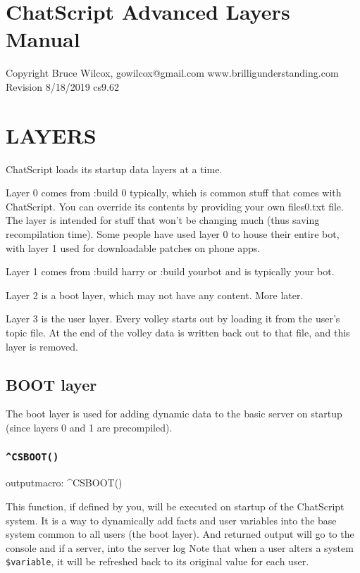 \documentclass[]{article}
\date{}
\begin{document}
\section{ChatScript Advanced Layers
Manual}\label{chatscript-advanced-layers-manual}

Copyright Bruce Wilcox, gowilcox@gmail.com www.brilligunderstanding.com
Revision 8/18/2019 cs9.62

\section{LAYERS}\label{layers}

ChatScript loads its startup data layers at a time.

Layer 0 comes from :build 0 typically, which is common stuff that comes
with ChatScript. You can override its contents by providing your own
files0.txt file. The layer is intended for stuff that won't be changing
much (thus saving recompilation time). Some people have used layer 0 to
house their entire bot, with layer 1 used for downloadable patches on
phone apps.

Layer 1 comes from :build harry or :build yourbot and is typically your
bot.

Layer 2 is a boot layer, which may not have any content. More later.

Layer 3 is the user layer. Every volley starts out by loading it from
the user's topic file. At the end of the volley data is written back out
to that file, and this layer is removed.

\subsection{BOOT layer}\label{boot-layer}

The boot layer is used for adding dynamic data to the basic server on
startup (since layers 0 and 1 are precompiled).

\subsubsection{\texorpdfstring{\texttt{\^{}CSBOOT()}}{\^{}CSBOOT()}}\label{csboot}

outputmacro: \^{}CSBOOT()

This function, if defined by you, will be executed on startup of the
ChatScript system. It is a way to dynamically add facts and user
variables into the base system common to all users (the boot layer). And
returned output will go to the console and if a server, into the server
log Note that when a user alters a system \texttt{\$variable}, it will
be refreshed back to its original value for each user.
\end{document}
